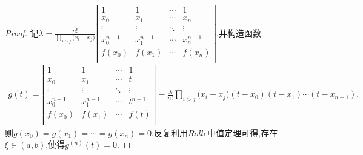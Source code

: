 \documentclass[lang=cn,newtx,10pt,scheme=chinese]{../Template/elegantbook}
\begin{document}
\begin{proof}
    记$\lambda =\frac{n!}{\prod_{i>j}{(x_i}-x_j)}\left| \begin{matrix}
        1&		1&		\cdots&		1\\
        x_0&		x_1&		\cdots&		x_n\\
        \vdots&		\vdots&		\ddots&		\vdots\\
        x_{0}^{n-1}&		x_{1}^{n-1}&		\cdots&		x_{n}^{n-1}\\
        f(x_0)&		f(x_1)&		\cdots&		f(x_n)\\
    \end{matrix} \right|$,并构造函数
    \begin{align}
        g\left( t \right) =\left| \begin{matrix}
            1&		1&		\cdots&		1\\
            x_0&		x_1&		\cdots&		t\\
            \vdots&		\vdots&		\ddots&		\vdots\\
            x_{0}^{n-1}&		x_{1}^{n-1}&		\cdots&		t^{n-1}\\
            f(x_0)&		f(x_1)&		\cdots&		f(t)\\
        \end{matrix} \right|-\frac{\lambda}{n!}\prod_{i>j}{(x_i}-x_j)\left( t-x_0 \right) \left( t-x_1 \right) \cdots \left( t-x_{n-1} \right) .
        \nonumber
    \end{align}
    则$g\left( x_0 \right) =g\left( x_1 \right) =\cdots =g\left( x_n \right) =0$.反复利用$Rolle$中值定理可得,存在$\xi\in(a,b)$,使得$g^{(n)}(t)=0$.


\end{proof}
\end{document}
